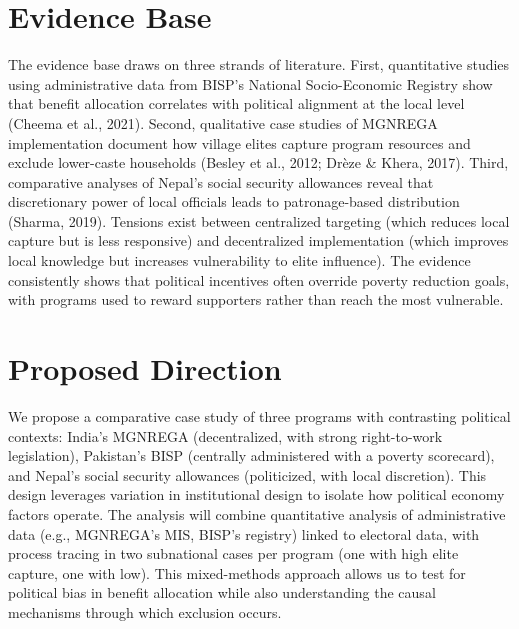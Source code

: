 \documentclass[10pt]{article}
\begin{document}
\section*{Evidence Base}
The evidence base draws on three strands of literature. First, quantitative studies using administrative data from BISP's National Socio-Economic Registry show that benefit allocation correlates with political alignment at the local level (Cheema et al., 2021). Second, qualitative case studies of MGNREGA implementation document how village elites capture program resources and exclude lower-caste households (Besley et al., 2012; Drèze \& Khera, 2017). Third, comparative analyses of Nepal's social security allowances reveal that discretionary power of local officials leads to patronage-based distribution (Sharma, 2019). Tensions exist between centralized targeting (which reduces local capture but is less responsive) and decentralized implementation (which improves local knowledge but increases vulnerability to elite influence). The evidence consistently shows that political incentives often override poverty reduction goals, with programs used to reward supporters rather than reach the most vulnerable.

\section*{Proposed Direction}
We propose a comparative case study of three programs with contrasting political contexts: India's MGNREGA (decentralized, with strong right-to-work legislation), Pakistan's BISP (centrally administered with a poverty scorecard), and Nepal's social security allowances (politicized, with local discretion). This design leverages variation in institutional design to isolate how political economy factors operate. The analysis will combine quantitative analysis of administrative data (e.g., MGNREGA's MIS, BISP's registry) linked to electoral data, with process tracing in two subnational cases per program (one with high elite capture, one with low). This mixed-methods approach allows us to test for political bias in benefit allocation while also understanding the causal mechanisms through which exclusion occurs.
\end{document}
